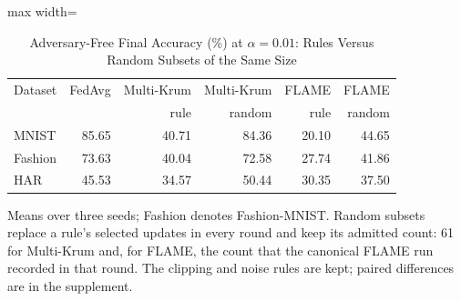 \begin{table}[!t]
\centering\footnotesize
\setlength{\tabcolsep}{4pt}
\caption{Adversary-Free Final Accuracy (\%) at $\alpha=0.01$: Rules Versus Random Subsets of the Same Size}\label{tab:random}
\begin{adjustbox}{max width=\columnwidth}
\begin{tabular}{lrrrrr}
\toprule
Dataset & FedAvg & Multi-Krum & Multi-Krum & FLAME & FLAME \\
 &  & rule & random & rule & random \\
\midrule
MNIST & 85.65 & 40.71 & 84.36 & 20.10 & 44.65 \\
Fashion & 73.63 & 40.04 & 72.58 & 27.74 & 41.86 \\
HAR & 45.53 & 34.57 & 50.44 & 30.35 & 37.50 \\
\bottomrule
\end{tabular}
\end{adjustbox}

\par\vspace{3pt}\parbox{\linewidth}{\footnotesize Means over three seeds; Fashion denotes Fashion-MNIST. Random subsets replace a rule's selected updates in every round and keep its admitted count: 61 for Multi-Krum and, for FLAME, the count that the canonical FLAME run recorded in that round. The clipping and noise rules are kept; paired differences are in the supplement.}
\end{table}
